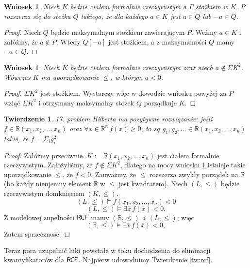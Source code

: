 \documentclass{article}
\newcommand{\R}{\mathbb{R}}
\theoremstyle{plain}
\newtheorem{tw}[thm]{Twierdzenie}
\newtheorem{wn}[thm]{Wniosek}
\theoremstyle{definition}
\theoremstyle{remark}
\newcommand{\RCF}{\mathsf{R \mkern-1.7mu C \mkern-1.4mu F}}
\begin{document}
\begin{wn}
	 Niech $K$ będzie ciałem formalnie rzeczywistym a $P$ stożkiem w $K$.
	 $P$ rozszerza się do stożka $Q$ takiego, że dla każdego $a \in K$ jest
	 $a \in Q$ lub $-a \in Q$.
\end{wn}
\begin{proof}
	 Niech $Q$ będzie maksymalnym stożkiem zawierającym $P$.
	 Weźmy $a \in K$ i załóżmy, że $a \not \in P$.
	 Wtedy $Q[-a]$ jest stożkiem, a z maksymalności $Q$ mamy $-a \in Q$.
\end{proof}

\begin{wn}
	\label{wn:forrz}
	 Niech $K$ będzie ciałem formalnie rzeczywistym oraz niech
	 $a \not \in \Sigma K^2$. Wówczas $K$ ma uporządkowanie $\leq$,
	 w którym $a < 0$.
\end{wn}
\begin{proof}
	 $\Sigma K^2$ jest stożkiem.
	 Wystarczy więc w dowodzie wniosku powyżej za $P$ wziąć $\Sigma K^2$ i
	 otrzymany maksymalny stożek $Q$ porządkuje $K$.
\end{proof}

\begin{tw}
	 17. problem Hilberta ma pozytywne rozwiązanie:
	 jeśli $f \in \R(x_1, x_2, \ldots, x_n)$ oraz $\forall \bar{x} \in \R^n
	 \, f(\bar{x}) \geq 0$,
	 to są $g_1, g_2, \ldots \in \R(x_1, x_2, \ldots, x_n)$ takie, że
	 $f = \Sigma_i g_i^2$
\end{tw}
\begin{proof}
	 Załóżmy przeciwnie.
	 $K := \R(x_1, x_2, \ldots, x_n) $ jest ciałem formalnie rzeczywistym.
	 Założyliśmy, że $f \not \in \Sigma K^2$, dlatego na mocy wniosku
	 \ref{wn:forrz} istnieje takie uporządkowanie $\leq$,
	 że $f < 0$. Zauważmy, że $\leq$ rozszerza zwykły porządek na $\R$ (bo
	 każdy nieujemny element $\R$ w $\leq$ jest kwadratem).
	 Niech $(L, \leq)$ będzie rzeczywistym domknięciem $(K, \leq)$.
	 \[
	 	 (L, \leq) \models f(x_1, x_2, \ldots, x_n ) < 0
	 \]
	 \[
	 	 (L, \leq) \models \exists \bar{x} \, f(\bar{x}) < 0.
	 \]
	 Z modelowej zupełności $\RCF$ mamy
	 $(\R, \leq) \preccurlyeq (L, \leq)$, więc
	 \[
	 	 (\R, \leq) \models \exists \bar{x} \, f(\bar{x}) < 0,
	 \]
Zatem sprzeczność.
\end{proof}


Teraz pora uzupełnić luki powstałe w toku dochodzenia do eliminacji
kwantyfikatorów dla $\RCF$. Najpierw udowodnimy Twierdzenie \ref{tw:rcf}.
\end{document}
